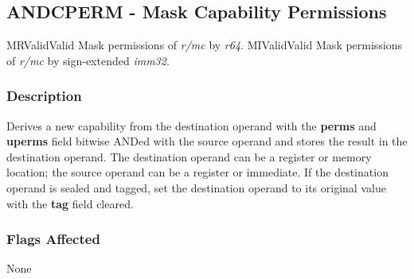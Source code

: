 \clearpage
{}
{}
\subsection*{ANDCPERM - Mask Capability Permissions}

\begin{x86opcodetable}
  {MR}{Valid}{Valid}
  {Mask permissions of \emph{r/mc} by \emph{r64}.}
  {MI}{Valid}{Valid}
  {Mask permissions of \emph{r/mc} by sign-extended \emph{imm32}.}
\end{x86opcodetable}

\begin{x86opentable}
\end{x86opentable}

\subsubsection*{Description}

Derives a new capability from the destination operand with the
\textbf{perms} and \textbf{uperms} field bitwise ANDed with the source
operand and stores the result in the destination operand.  The
destination operand can be a register or memory location; the source
operand can be a register or immediate.  If the destination operand is
sealed and tagged, set the destination operand to its original value
with the \textbf{tag} field cleared.

\subsubsection*{Flags Affected}

None
